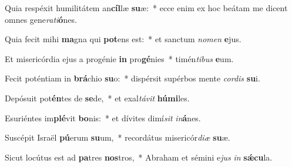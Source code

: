 ﻿\setcounter{enumi}{2}
\item Quia respéxit humilitátem an\textbf{cíl}læ \textbf{su}æ:~* ecce enim ex hoc beátam me dicent omnes gene\textit{ra}\textit{ti}\textbf{ó}nes.

\item Quia fecit mihi \textbf{ma}gna qui \textbf{pot}ens est:~* et sanctum \textit{no}\textit{men} \textbf{e}jus.

\item Et misericórdia ejus a progénie \textbf{in} pro\textbf{gé}nies~* timén\textit{ti}\textit{bus} \textbf{e}um.

\item Fecit poténtiam in \textbf{brá}chio \textbf{su}o:~* dispérsit supérbos mente \textit{cor}\textit{dis} \textbf{su}i.

\item Depósuit pot\textbf{én}tes de \textbf{se}de,~* et exal\textit{tá}\textit{vit} \textbf{hú}\textbf{mi}les.

\item Esuriéntes im\textbf{plé}vit \textbf{bo}nis:~* et dívites dimí\textit{sit} \textit{in}\textbf{á}nes.

\item Suscépit Israël \textbf{pú}erum \textbf{su}um,~* recordátus misericór\textit{di}\textit{æ} \textbf{su}æ.

\item Sicut locútus est ad \textbf{pa}tres \textbf{nos}tros,~* Abraham et sémini e\textit{jus} \textit{in} \textbf{sǽ}\textbf{cu}la.